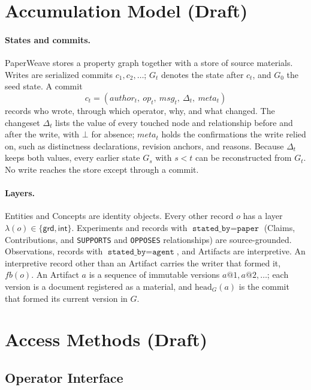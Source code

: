 \documentclass[sigconf,review,anonymous]{acmart}
\begin{document}
\section{Accumulation Model (Draft)}
\label{sec:model-draft}

\paragraph{States and commits.}
PaperWeave stores a property graph together with a store of source materials.
Writes are serialized commits $c_1, c_2, \ldots$; $G_t$ denotes the state after
$c_t$, and $G_0$ the seed state. A commit
\[
c_t = (\mathit{author}_t,\ \mathit{op}_t,\ \mathit{msg}_t,\ \Delta_t,\
  \mathit{meta}_t)
\]
records who wrote, through which operator, why, and what changed. The
changeset $\Delta_t$ lists the value of every touched node and relationship
before and after the write, with $\bot$ for absence; $\mathit{meta}_t$ holds the
confirmations the write relied on, such as distinctness declarations, revision
anchors, and reasons. Because $\Delta_t$ keeps both values, every earlier state
$G_s$ with $s<t$ can be reconstructed from $G_t$. No write reaches the store
except through a commit.

\paragraph{Layers.}
Entities and Concepts are identity objects. Every other record $o$ has a layer
$\lambda(o)\in\{\mathsf{grd},\mathsf{int}\}$. Experiments and records with
$\texttt{stated\_by}=\texttt{paper}$ (Claims, Contributions, and
\texttt{SUPPORTS} and \texttt{OPPOSES} relationships) are source-grounded.
Observations, records with $\texttt{stated\_by}=\texttt{agent}$, and Artifacts
are interpretive. An interpretive record other than an Artifact carries the
writer that formed it, $\mathit{fb}(o)$. An Artifact $a$ is a sequence of
immutable versions $a@1, a@2, \ldots$; each version is a document registered as
a material, and $\mathrm{head}_G(a)$ is the commit that formed its current
version in $G$.

\section{Access Methods (Draft)}
\label{sec:access-draft}

\subsection{Operator Interface}
\label{sec:interface-draft}
\end{document}
